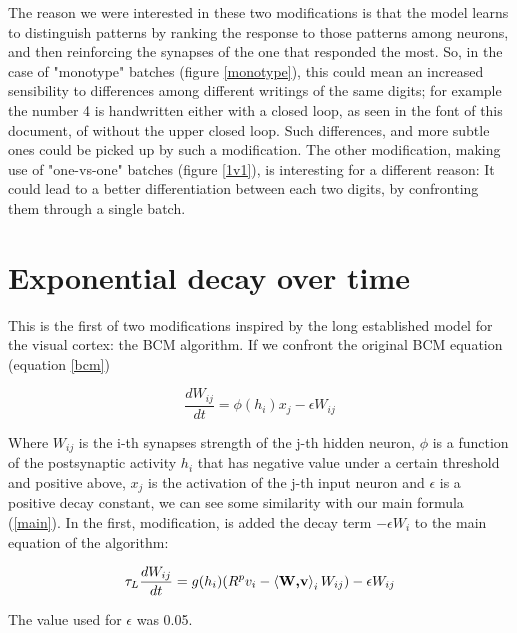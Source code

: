 \documentclass[a4paper]{report}
\begin{document}
The reason we were interested in these two modifications is that the model learns to distinguish patterns by ranking the response to those patterns among neurons, and then reinforcing the synapses of the one that responded the most.
So, in the case of "monotype" batches (figure \ref{monotype}), this could mean an increased sensibility to differences among different writings of the same digits;
for example the number 4 is handwritten either with a closed loop, as seen in the font of this document, of without the upper closed loop.
Such differences, and more subtle ones could be picked up by such a modification.
The other modification, making use of "one-vs-one" batches (figure \ref{1v1}), is interesting for a different reason:
It could lead to a better differentiation between each two digits, by confronting them through a single batch.

\section{Exponential decay over time}

This is the first of two modifications inspired by the long established model for the visual cortex:
the BCM algorithm.
If we confront the original BCM equation (equation \ref{bcm})

\begin{equation}
    \frac{dW_{ij}}{dt} = \phi(h_i)x_{j} - \epsilon W_{ij}
    \label{bcm}
\end{equation}

Where $W_{ij}$ is the i-th synapses strength of the j-th hidden neuron, $\phi$ is a function of the postsynaptic activity $h_i$ that has negative value under a certain threshold and positive above, $x_{j}$ is the activation of the j-th input neuron and $\epsilon$ is a positive decay constant, we can see some similarity with our main formula (\ref{main}).
In the first, modification, is added the decay term $-\epsilon W_i$ to the main equation of the algorithm:

\begin{equation}\label{099}
    \tau_L \frac{dW_{ij}}{dt} = g(h_i)(R^p v_i - \braket{\textbf{W,v}}_i W_{ij} ) -\epsilon W_{ij}
\end{equation}

The value used for $\epsilon$ was 0.05. 
\end{document}

